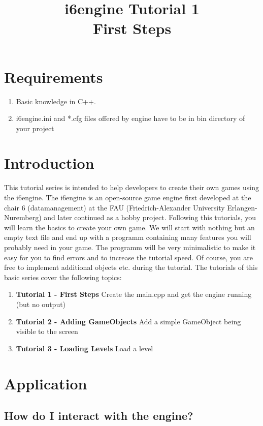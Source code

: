 \documentclass{article}
\title{i6engine Tutorial 1 \\ First Steps}
\begin{document}
\section{Requirements}


\begin{enumerate}
\item Basic knowledge in C++.
\item i6engine.ini and *.cfg files offered by engine have to be in bin directory of your project
\end{enumerate}

\section{Introduction}

This tutorial series is intended to help developers to create their own games using the i6engine. The i6engine is an open-source game engine first developed at the chair 6 (datamanagement) at the FAU (Friedrich-Alexander University Erlangen-Nuremberg) and later continued as a hobby project.\newline
Following this tutorials, you will learn the basics to create your own game. We will start with nothing but an empty text file and end up with a programm containing many features you will probably need in your game. The programm will be very minimalistic to make it easy for you to find errors and to increase the tutorial speed. Of course, you are free to implement additional objects etc. during the tutorial.\newline
The tutorials of this basic series cover the following topics:\newline
\begin{enumerate}
\item \textbf{Tutorial 1 - First Steps} Create the main.cpp and get the engine running (but no output)
\item \textbf{Tutorial 2 - Adding GameObjects} Add a simple GameObject being visible to the screen
\item \textbf{Tutorial 3 - Loading Levels} Load a level
\end{enumerate}

\section{Application}

\subsection{How do I interact with the engine?}
\end{document}
